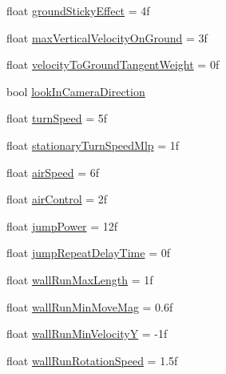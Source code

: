 \begin{DoxyCompactItemize}
\item 
float \mbox{\hyperlink{class_root_motion_1_1_demos_1_1_character_third_person_a5c8c216f03f5d3ebdca3fba6182ff7f6}{ground\+Sticky\+Effect}} = 4f
\item 
float \mbox{\hyperlink{class_root_motion_1_1_demos_1_1_character_third_person_a7c130e3854c316f04362e23707242f18}{max\+Vertical\+Velocity\+On\+Ground}} = 3f
\item 
float \mbox{\hyperlink{class_root_motion_1_1_demos_1_1_character_third_person_ac685b5bf372c5c990521a0ad6ece0075}{velocity\+To\+Ground\+Tangent\+Weight}} = 0f
\item 
bool \mbox{\hyperlink{class_root_motion_1_1_demos_1_1_character_third_person_aec5b3a3e62d62a07d0a3d8ac3b5f2aea}{look\+In\+Camera\+Direction}}
\item 
float \mbox{\hyperlink{class_root_motion_1_1_demos_1_1_character_third_person_ae416691af8cd569c9b388a871750e5af}{turn\+Speed}} = 5f
\item 
float \mbox{\hyperlink{class_root_motion_1_1_demos_1_1_character_third_person_a9389c41ec7007ddc8d0d2d51915073b9}{stationary\+Turn\+Speed\+Mlp}} = 1f
\item 
float \mbox{\hyperlink{class_root_motion_1_1_demos_1_1_character_third_person_a7b38cc312cec0255bd9460360821bd1d}{air\+Speed}} = 6f
\item 
float \mbox{\hyperlink{class_root_motion_1_1_demos_1_1_character_third_person_aedb12c6385437e31cb32ac0efa15ce0e}{air\+Control}} = 2f
\item 
float \mbox{\hyperlink{class_root_motion_1_1_demos_1_1_character_third_person_a53fa9dbfb20209bd280d7e801da92723}{jump\+Power}} = 12f
\item 
float \mbox{\hyperlink{class_root_motion_1_1_demos_1_1_character_third_person_a2daa698dae6f065a89351914f89600c1}{jump\+Repeat\+Delay\+Time}} = 0f
\item 
float \mbox{\hyperlink{class_root_motion_1_1_demos_1_1_character_third_person_a3f159402e1b30d47abcb951b117a0229}{wall\+Run\+Max\+Length}} = 1f
\item 
float \mbox{\hyperlink{class_root_motion_1_1_demos_1_1_character_third_person_a37296aef3603b226991b5f6a7b82d6f7}{wall\+Run\+Min\+Move\+Mag}} = 0.\+6f
\item 
float \mbox{\hyperlink{class_root_motion_1_1_demos_1_1_character_third_person_a2640fb181f968fadbebb6c5c69f0b091}{wall\+Run\+Min\+VelocityY}} = -\/1f
\item 
float \mbox{\hyperlink{class_root_motion_1_1_demos_1_1_character_third_person_a807802e481863af52a0daa9aa529e882}{wall\+Run\+Rotation\+Speed}} = 1.\+5f

\end{DoxyCompactItemize}
